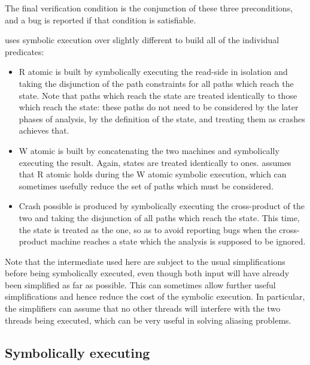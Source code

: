   The final verification condition is the
conjunction of these three preconditions, and a bug is reported if
that condition is satisfiable.

{\Technique} uses symbolic execution over slightly different
{\StateMachines} to build all of the individual predicates:

\begin{itemize}
\item R atomic is built by symbolically executing the read-side
  {\StateMachine} in isolation and taking the disjunction of the path
  constraints for all paths which reach the  state.
  Note that paths which reach the  state are treated
  identically to those which reach the  state: these
  paths do not need to be considered by the later phases of analysis,
  by the definition of the  state, and treating them
  as crashes achieves that.
\item W atomic is built by concatenating the two machines and
  symbolically executing the result.  Again,  states
  are treated identically to  ones.  {\Technique} assumes
  that R atomic holds during the W atomic symbolic execution, which
  can sometimes usefully reduce the set of paths which must be
  considered.
\item Crash possible is produced by symbolically executing the
  cross-product of the two {\StateMachines} and taking the disjunction
  of all paths which reach the  state.  This time, the
   state is treated as the  one, so as
  to avoid reporting bugs when the cross-product machine reaches a
  state which the analysis is supposed to be ignored.
\end{itemize}

Note that the intermediate {\StateMachines} used here are subject to
the usual simplifications before being symbolically executed, even
though both input {\StateMachines} will have already been simplified
as far as possible.  This can sometimes allow further useful
simplifications and hence reduce the cost of the symbolic execution.
In particular, the simplifiers can assume that no other threads will
interfere with the two threads being executed, which can be very
useful in solving aliasing problems.

\subsection{Symbolically executing {\StateMachines}}

